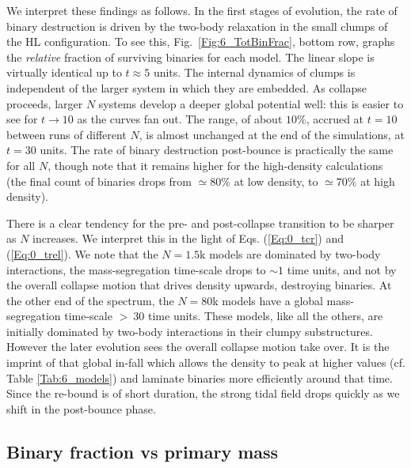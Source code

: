 We interpret these findings as follows. In the first stages of evolution, the rate of binary destruction is driven by the two-body relaxation in the small clumps of the HL configuration. To see this, Fig.~\ref{Fig:6_TotBinFrac}, bottom row, graphs the {\it relative} fraction of surviving binaries for each model. The linear slope is virtually identical up to $t \approx 5$ units. The internal dynamics of clumps is independent of the larger system in which they are embedded.
As collapse proceeds, larger $N$ systems develop a deeper global potential well: this is easier to see for  $t \rightarrow 10$ as the curves fan out. The range, of about $10\%$,  accrued at $t = 10$  between runs of different $N$, is almost unchanged at the end of the simulations, at $t = 30$ units. 
The rate of binary destruction post-bounce is practically the same for all $N$, though note that it remains higher for the high-density calculations (the final count of binaries drops from $\simeq 80\%$ at low density, to $\simeq 70\%$ at high density).

There is a clear tendency for the pre- and post-collapse transition to be sharper as $N$ increases. We interpret this in the light of Eqs. (\ref{Eq:0_tcr}) and (\ref{Eq:0_trel}).  
We note that the $N = 1.5$k models are dominated by two-body interactions, the mass-segregation time-scale drops to $\sim 1$ time units, and not by the overall collapse motion that drives density upwards, destroying binaries.
  At the other end of the spectrum, the $N = 80$k  models have a global mass-segregation time-scale $>~30$ time units.  These models, like all the others,  are initially dominated by two-body interactions in  their clumpy substructures. However the later evolution sees the overall collapse motion take over.
  It is the imprint of that global in-fall which allows the density to peak at higher values (cf. Table \ref{Tab:6_models}) and laminate binaries more   efficiently around that time. Since the re-bound is of short duration, the strong tidal field drops quickly as we shift in the post-bounce phase.



\subsection{Binary fraction vs primary mass}



